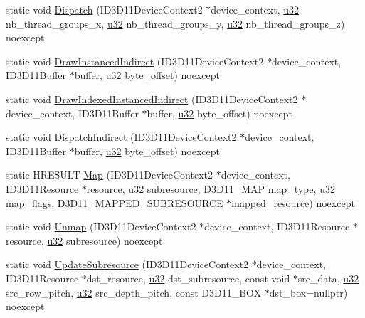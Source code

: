 \begin{DoxyCompactItemize}
\item 
static void \hyperlink{structmage_1_1_pipeline_a7633a76417da877302aaeccfba3834be}{Dispatch} (I\+D3\+D11\+Device\+Context2 $\ast$device\+\_\+context, \hyperlink{namespacemage_af2b398bf98eb10351f49cad73fe2cc73}{u32} nb\+\_\+thread\+\_\+groups\+\_\+x, \hyperlink{namespacemage_af2b398bf98eb10351f49cad73fe2cc73}{u32} nb\+\_\+thread\+\_\+groups\+\_\+y, \hyperlink{namespacemage_af2b398bf98eb10351f49cad73fe2cc73}{u32} nb\+\_\+thread\+\_\+groups\+\_\+z) noexcept
\item 
static void \hyperlink{structmage_1_1_pipeline_aa3b1e4b3ab6f3ea3dba6218dbb08bc4f}{Draw\+Instanced\+Indirect} (I\+D3\+D11\+Device\+Context2 $\ast$device\+\_\+context, I\+D3\+D11\+Buffer $\ast$buffer, \hyperlink{namespacemage_af2b398bf98eb10351f49cad73fe2cc73}{u32} byte\+\_\+offset) noexcept
\item 
static void \hyperlink{structmage_1_1_pipeline_ad2ced01d3fbdea7506ee45eaea7d2d3a}{Draw\+Indexed\+Instanced\+Indirect} (I\+D3\+D11\+Device\+Context2 $\ast$device\+\_\+context, I\+D3\+D11\+Buffer $\ast$buffer, \hyperlink{namespacemage_af2b398bf98eb10351f49cad73fe2cc73}{u32} byte\+\_\+offset) noexcept
\item 
static void \hyperlink{structmage_1_1_pipeline_a01c9771fd09522b313d61062b796ce9a}{Dispatch\+Indirect} (I\+D3\+D11\+Device\+Context2 $\ast$device\+\_\+context, I\+D3\+D11\+Buffer $\ast$buffer, \hyperlink{namespacemage_af2b398bf98eb10351f49cad73fe2cc73}{u32} byte\+\_\+offset) noexcept
\item 
static H\+R\+E\+S\+U\+LT \hyperlink{structmage_1_1_pipeline_a5b145ad92c746487b4eeec7c2d190729}{Map} (I\+D3\+D11\+Device\+Context2 $\ast$device\+\_\+context, I\+D3\+D11\+Resource $\ast$resource, \hyperlink{namespacemage_af2b398bf98eb10351f49cad73fe2cc73}{u32} subresource, D3\+D11\+\_\+\+M\+AP map\+\_\+type, \hyperlink{namespacemage_af2b398bf98eb10351f49cad73fe2cc73}{u32} map\+\_\+flags, D3\+D11\+\_\+\+M\+A\+P\+P\+E\+D\+\_\+\+S\+U\+B\+R\+E\+S\+O\+U\+R\+CE $\ast$mapped\+\_\+resource) noexcept
\item 
static void \hyperlink{structmage_1_1_pipeline_abf97ef26c574b5a25bd7ae4c28f5135b}{Unmap} (I\+D3\+D11\+Device\+Context2 $\ast$device\+\_\+context, I\+D3\+D11\+Resource $\ast$resource, \hyperlink{namespacemage_af2b398bf98eb10351f49cad73fe2cc73}{u32} subresource) noexcept
\item 
static void \hyperlink{structmage_1_1_pipeline_ad7bee316db5bf5f4eec16487707ee082}{Update\+Subresource} (I\+D3\+D11\+Device\+Context2 $\ast$device\+\_\+context, I\+D3\+D11\+Resource $\ast$dst\+\_\+resource, \hyperlink{namespacemage_af2b398bf98eb10351f49cad73fe2cc73}{u32} dst\+\_\+subresource, const void $\ast$src\+\_\+data, \hyperlink{namespacemage_af2b398bf98eb10351f49cad73fe2cc73}{u32} src\+\_\+row\+\_\+pitch, \hyperlink{namespacemage_af2b398bf98eb10351f49cad73fe2cc73}{u32} src\+\_\+depth\+\_\+pitch, const D3\+D11\+\_\+\+B\+OX $\ast$dst\+\_\+box=nullptr) noexcept

\end{DoxyCompactItemize}
